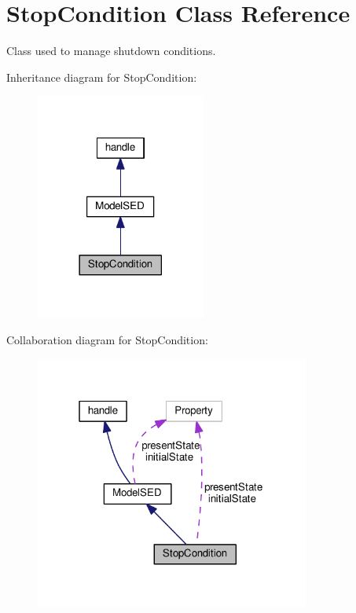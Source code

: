 \hypertarget{class_stop_condition}{}\section{Stop\+Condition Class Reference}
\label{class_stop_condition}


Class used to manage shutdown conditions.  




Inheritance diagram for Stop\+Condition\+:\nopagebreak
\begin{figure}[H]
\begin{center}
\leavevmode
\includegraphics[width=158pt]{class_stop_condition__inherit__graph}
\end{center}
\end{figure}


Collaboration diagram for Stop\+Condition\+:\nopagebreak
\begin{figure}[H]
\begin{center}
\leavevmode
\includegraphics[width=256pt]{class_stop_condition__coll__graph}
\end{center}
\end{figure}
